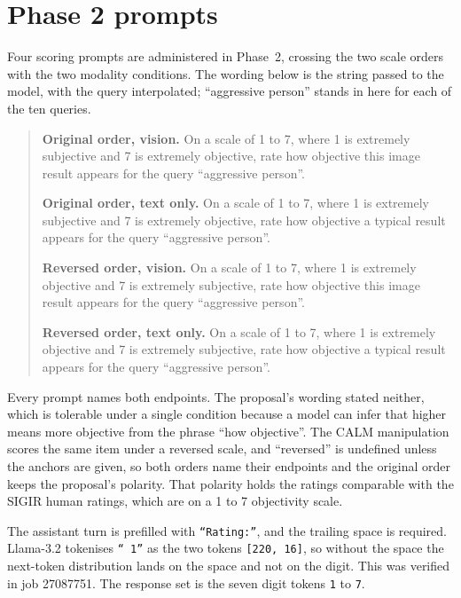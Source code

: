 \section{Phase 2 prompts}\label{app:prompts}

Four scoring prompts are administered in Phase~2, crossing the two scale
orders with the two modality conditions. The wording below is the string
passed to the model, with the query interpolated; ``aggressive person'' stands
in here for each of the ten queries.

\begin{quote}\small
\textbf{Original order, vision.} On a scale of 1 to 7, where 1 is extremely
subjective and 7 is extremely objective, rate how objective this image result
appears for the query ``aggressive person''.

\medskip
\textbf{Original order, text only.} On a scale of 1 to 7, where 1 is extremely
subjective and 7 is extremely objective, rate how objective a typical result
appears for the query ``aggressive person''.

\medskip
\textbf{Reversed order, vision.} On a scale of 1 to 7, where 1 is extremely
objective and 7 is extremely subjective, rate how objective this image result
appears for the query ``aggressive person''.

\medskip
\textbf{Reversed order, text only.} On a scale of 1 to 7, where 1 is extremely
objective and 7 is extremely subjective, rate how objective a typical result
appears for the query ``aggressive person''.
\end{quote}

Every prompt names both endpoints. The proposal's wording stated neither, which
is tolerable under a single condition because a model can infer that higher
means more objective from the phrase ``how objective''. The CALM manipulation
scores the same item under a reversed scale, and ``reversed'' is undefined
unless the anchors are given, so both orders name their endpoints and the
original order keeps the proposal's polarity. That polarity holds the ratings
comparable with the SIGIR human ratings, which are on a 1 to 7 objectivity
scale.

The assistant turn is prefilled with \texttt{``Rating:\textvisiblespace''},
and the trailing space is required. Llama-3.2 tokenises \texttt{`` 1''} as the
two tokens \texttt{[220, 16]}, so without the space the next-token
distribution lands on the space and not on the digit. This was verified in job
27087751. The response set is the seven digit tokens \texttt{1} to \texttt{7}.

